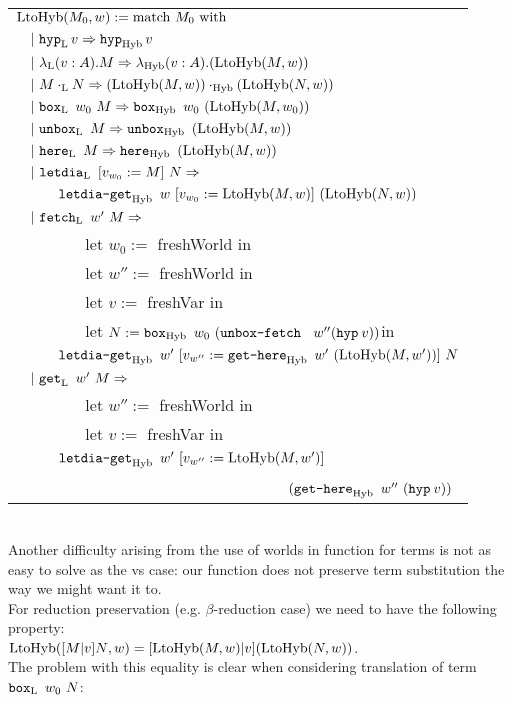 \begin{tabular} { @{} l }
$\funLtoHyb{M_0} {w} := \match{M_0} $\\
$~~~|~ \hyp[\tL]{v} => \hyp[\tHyb] v$\\
$~~~|~ \lam[\tL]{v}{A}{M} => \lam[\tHyb]{v}{A}(\funLtoHyb{M}{w}) $\\
$~~~|~ \appl[\tL]{M}{N} => \appl[\tHyb]{(\funLtoHyb{M}{w})} {(\funLtoHyb{N}{w})}$\\
$~~~|~ \bbox[\tL]{w_0}{M} => \bbox[\tHyb]{w_0}(\funLtoHyb{M}{w_0}) $\\
$~~~|~ \unbox[\tL]{M} => \unbox[\tHyb](\funLtoHyb{M}{w}) $\\
$~~~|~ \here[\tL]{M} => \here[\tHyb](\funLtoHyb{M}{w}) $\\
$~~~|~ \letdia[\tL]{v}{w_0}{M}{N} => $\\
$~~~~~~~~~\letdiaget[\tHyb]{w}{v}{w_0}{\funLtoHyb{M}{w}}{(\funLtoHyb{N}{w})}$\\
$~~~|~ \fetch[\tL]{w'}{M} => $\\
~~~~~~~~ let  $w_0 := $ freshWorld in\\
~~~~~ ~~~let  $w'' := $ freshWorld in\\
~~~~~~~~ let  $v := $ freshVar in\\
~~~~~~~~ let  $N := \bbox[\tHyb]{w_0}{(\unboxfetch {w''} {(\hyp{v})})}$in\\
$~~~~~~~~~ \letdiaget[\tHyb]{w'}{v}{w''} {\gethere[\tHyb]{w'}{(\funLtoHyb{M}{w'})}} {N} $\\
$~~~|~ \get[\tL]{w'}{M} => $\\
~~~~~~~~ let  $w'' := $ freshWorld in\\
~~~~~~~~ let  $v := $ freshVar in\\
$~~~~~~~~~ \letdiaget[\tHyb]{w'}{v}{w''}{\funLtoHyb{M}{w'}}{}$\\
~~~~~~~~~~~~~~~~~~~~~~~~~~~~~~~~~~${(\gethere[\tHyb]{w''}{(\hyp{v})})}$ 
\end{tabular}\\

Another difficulty arising from the use of worlds in \funLtoHybe{} function for terms is not as easy to solve as the \unboxe{} vs \unboxfetche{} case: our function does not preserve term substitution the way we might want it to.\\

For reduction preservation (e.g. $\beta$-reduction case) we need to have the following property:\\
 $\funLtoHyb{\substt{M}{v}{N}}{w} = \substt{\funLtoHyb{M}{w}}{v}{(\funLtoHyb{N}{w})}$.\\
The problem with this equality is clear when considering translation of term $\bbox[\tL]{w_0}{N}$:\\

